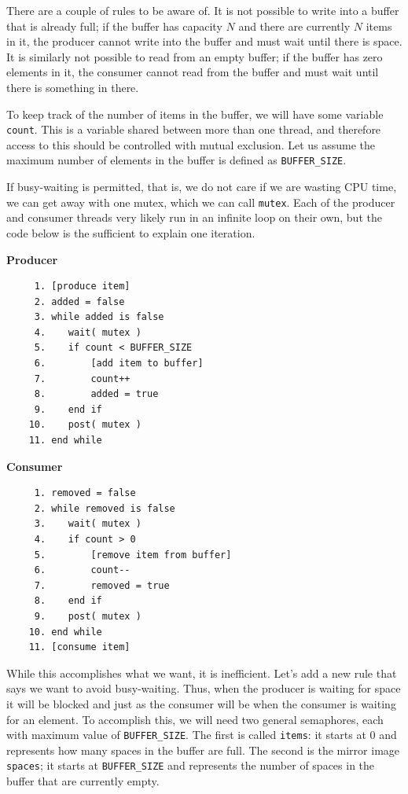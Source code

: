 \documentclass[a4paper]{report}
\begin{document}
There are a couple of rules to be aware of. It is not possible to write into a buffer that is already full; if the buffer has capacity $N$ and there are currently $N$ items in it, the producer cannot write into the buffer and must wait until there is space. It is similarly not possible to read from an empty buffer; if the buffer has zero elements in it, the consumer cannot read from the buffer and must wait until there is something in there.

To keep track of the number of items in the buffer, we will have some variable \texttt{count}. This is a variable shared between more than one thread, and therefore access to this should be controlled with mutual exclusion. Let us assume the maximum number of elements in the buffer is defined as \texttt{BUFFER\_SIZE}.

If busy-waiting is permitted, that is, we do not care if we are wasting CPU time, we can get away with one mutex, which we can call \texttt{mutex}. Each of the producer and consumer threads very likely run in an infinite loop on their own, but the code below is the sufficient to explain one iteration.

\begin{multicols}{2}
	\textbf{Producer}\vspace{-2em}
	\begin{verbatim}
	 1. [produce item]
	 2. added = false
	 3. while added is false
	 4.    wait( mutex )
	 5.    if count < BUFFER_SIZE
	 6.        [add item to buffer]
	 7.        count++
	 8.        added = true
	 9.    end if
	10.    post( mutex )
	11. end while
  \end{verbatim}
	\columnbreak
	\textbf{Consumer}\vspace{-2em}
	\begin{verbatim}
	 1. removed = false
	 2. while removed is false
	 3.    wait( mutex )
	 4.    if count > 0
	 5.        [remove item from buffer]
	 6.        count--
	 7.        removed = true
	 8.    end if
	 9.    post( mutex )
	10. end while
	11. [consume item]
  \end{verbatim}
\end{multicols}
\vspace{-2em}


While this accomplishes what we want, it is inefficient. Let's add a new rule that says we want to avoid busy-waiting. Thus, when the producer is waiting for space it will be blocked and just as the consumer will be when the consumer is waiting for an element. To accomplish this, we will need two general semaphores, each with maximum value of \texttt{BUFFER\_SIZE}. The first is called \texttt{items}: it starts at 0 and represents how many spaces in the buffer are full. The second is the mirror image \texttt{spaces}; it starts at \texttt{BUFFER\_SIZE} and represents the number of spaces in the buffer that are currently empty.
\end{document}
